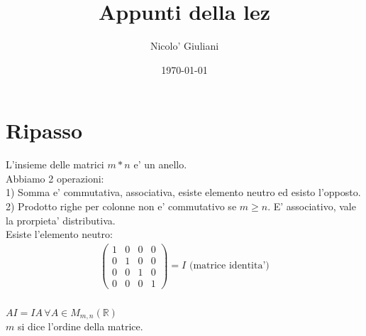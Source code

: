 \documentclass[a4paper,12pt]{article}
\title{Appunti della lez}
\author{Nicolo' Giuliani}
\date{\today}
\begin{document}
\section{Ripasso}
L'insieme delle matrici $m * n$ e' un anello.
\\Abbiamo 2 operazioni:
\\1) Somma e' commutativa, associativa, esiste elemento neutro ed esisto l'opposto.
\\2) Prodotto righe per colonne non e' commutativo se $m \geq n$. E' associativo, vale la prorpieta' distributiva.
\\Esiste l'elemento neutro:
\begin{align*}
    \begin{pmatrix}
        1 & 0 &0 & 0 \\
        0 & 1 & 0 & 0 \\
        0 & 0 & 1 & 0 \\
        0 & 0 & 0 & 1
    \end{pmatrix}
    =I \text{ (matrice identita')}
\end{align*}
\\$AI=IA \, \forall A \in M_{m,n}(\mathbb{R})$
\\$m$ si dice l'ordine della matrice.
\end{document}
